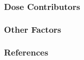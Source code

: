 \documentclass[9pt]{beamer}
\begin{document}
\subsubsection{Dose Contributors}

\subsubsection{Other Factors}


\begin{frame}[allowframebreaks]
  \frametitle{References}
  
  {\footnotesize  }

\end{frame}

\end{document}
